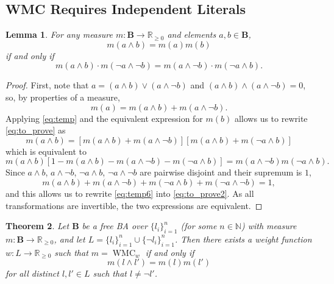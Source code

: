 \documentclass{article}
\newtheorem{theorem}{Theorem}
\newtheorem{lemma}[theorem]{Lemma}
\theoremstyle{definition}
\theoremstyle{remark}
\DeclareMathOperator{\WMC}{WMC}
\begin{document}

\subsection{WMC Requires Independent Literals}

\begin{lemma} \label{lemma:before_theorem}
  For any measure $m\colon \mathbf{B} \to \mathbb{R}_{\ge 0}$ and elements $a, b
  \in \mathbf{B}$,
  \begin{equation} \label{eq:to_prove}
    m(a \land b) = m(a)m(b)
  \end{equation}
  if and only if
  \begin{equation} \label{eq:to_prove2}
    m(a \land b) \cdot m(\neg a \land \neg b) = m(a \land \neg b)
    \cdot m(\neg a \land b).
  \end{equation}
\end{lemma}
\begin{proof}
  First, note that $a = (a \land b) \lor (a \land \neg b)$ and $(a \land b)
  \land (a \land \neg b) = 0$, so, by properties of a measure,
  \begin{equation} \label{eq:temp}
    m(a) = m(a \land b) + m(a \land \neg b).
  \end{equation}
  Applying \cref{eq:temp} and the equivalent expression for $m(b)$ allows us
  to rewrite \cref{eq:to_prove} as
  \[
    m(a \land b) = [m(a \land b) + m(a \land \neg b)][m(a \land b) + m(\neg a
    \land b)]
  \]
  which is equivalent to
  \begin{equation} \label{eq:temp6}
    m(a \land b)[1 - m(a \land b) - m(a \land \neg b) - m(\neg a \land b)] = m(a
    \land \neg b)m(\neg a \land b).
  \end{equation}
  Since $a \land b$, $a \land \neg b$, $\neg a \land b$, $\neg a \land \neg b$
  are pairwise disjoint and their supremum is $1$,
  \[
    m(a \land b) + m(a \land \neg b) + m(\neg a \land b) + m(\neg a \land \neg
    b) = 1,
  \]
  and this allows us to rewrite \cref{eq:temp6} into \cref{eq:to_prove2}. As all
  transformations are invertible, the two expressions are equivalent.
\end{proof}

\begin{theorem}
  Let $\mathbf{B}$ be a free BA over $\{ l_i \}_{i=1}^n$ (for some $n \in
  \mathbb{N}$) with measure $m\colon \mathbf{B} \to \mathbb{R}_{\ge 0}$, and let
  $L = \{ l_i \}_{i = 1}^n \cup \{ \neg l_i \}_{i = 1}^n$. Then there exists a
  weight function $w\colon L \to \mathbb{R}_{\ge 0}$ such that $m = \WMC_w$ if
  and only if
  \begin{equation} \label{eq:wmccondition}
  m(l \land l') = m(l)m(l')
  \end{equation}
  for all distinct $l, l' \in L$ such that $l \ne \neg l'$.
\end{theorem}
\end{document}

